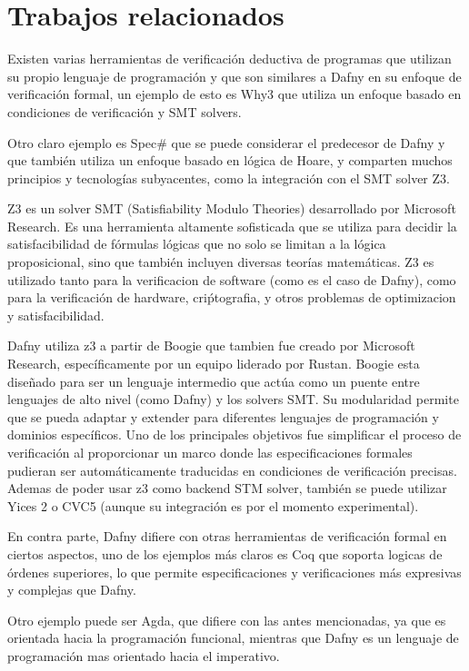 \documentclass[runningheads]{llncs}
\begin{document}
\section{Trabajos relacionados} 
Existen varias herramientas de verificación deductiva de programas que utilizan su propio lenguaje de programación 
y que son similares a Dafny en su enfoque de verificación formal, 
un ejemplo de esto es Why3 que utiliza un enfoque basado en condiciones de verificación y SMT solvers.

Otro claro ejemplo es Spec\# que se puede considerar el predecesor de Dafny y que también utiliza un enfoque basado en lógica de Hoare,
y comparten muchos principios y tecnologías subyacentes, como la integración con el SMT solver Z3.

Z3 es un solver SMT (Satisfiability Modulo Theories) desarrollado por Microsoft Research. 
Es una herramienta altamente sofisticada que se utiliza para decidir la satisfacibilidad de fórmulas lógicas que no solo se limitan a la lógica proposicional, 
sino que también incluyen diversas teorías matemáticas.
Z3 es utilizado tanto para la verificacion de software (como es el caso de Dafny),
como para la verificación de hardware, criṕtografia, y otros problemas de optimizacion y satisfacibilidad.

Dafny utiliza z3 a partir de Boogie que tambien fue creado por Microsoft Research, específicamente por un equipo liderado por Rustan. 
Boogie esta diseñado para ser un lenguaje intermedio que actúa como un puente entre lenguajes de alto nivel (como Dafny) y los solvers SMT. 
Su modularidad permite que se pueda adaptar y extender para diferentes lenguajes de programación y dominios específicos.
Uno de los principales objetivos fue simplificar el proceso de verificación al proporcionar un marco donde las especificaciones formales pudieran ser automáticamente 
traducidas en condiciones de verificación precisas. Ademas de poder usar z3 como backend STM solver, 
también se puede utilizar Yices 2 o CVC5 (aunque su integración es por el momento experimental).

En contra parte, Dafny difiere con otras herramientas de verificación formal en ciertos aspectos, uno de los ejemplos más claros es Coq 
que soporta logicas de órdenes superiores, lo que permite especificaciones y verificaciones más expresivas y complejas que Dafny.

Otro ejemplo puede ser Agda, que difiere con las antes mencionadas, ya que 
es orientada hacia la programación funcional, mientras que Dafny es un lenguaje de programación mas orientado hacia el imperativo. 
 
\end{document}
